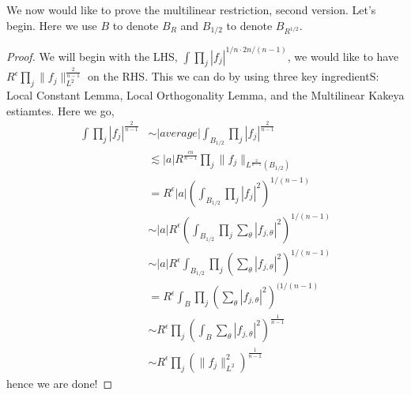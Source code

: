 We now would like to prove the multilinear restriction, second version. Let's begin. Here we use $B$ to denote $B_R$ and $B_{1/2}$ to denote $B_{R^{1/2}}$.
\begin{proof}
    We will begin with the LHS, $\int\prod_j|f_j|^{1/n\cdot2n/(n-1)}$, we would like to have $R^\epsilon\prod_j\|f_j\|_{L^2}^{\frac{2}{n-1}}$ on the RHS.
    This we can do by using three key ingredientS: Local Constant Lemma, Local Orthogonality Lemma, and the Multilinear Kakeya estiamtes. Here we go,
    \begin{align*}
        \int\prod_j|f_j|^{\frac{2}{n-1}}&\sim |average|\int_{B_{1/2}}\prod_j|f_j|^{\frac{2}{n-1}}\\
        &\lesssim |a|R^{\frac{\epsilon n}{n-1}}\prod_j\|f_j\|_{L^\frac{2}{n-1}(B_{1/2})}\\
        &=R^\epsilon |a|\left(\int_{B_{1/2}}\prod_j|f_j|^2\right)^{1/(n-1)}\\
        &\sim |a|R^\epsilon\left(\int_{B_{1/2}}\prod_j\sum_\theta|f_{j,\theta}|^2\right)^{1/(n-1)}\\
        &\sim |a|R^\epsilon\int_{B_{1/2}}\prod_j\left(\sum_\theta|f_{j,\theta}|^2\right)^{1/(n-1)}\\
        &=R^\epsilon\int_B\prod_j\left(\sum_\theta|f_{j,\theta}|^2\right)^{(1/(n-1)}\\
        &\sim R^\epsilon\prod_j\left(\int_B\sum_\theta|f_{j,\theta}|^2\right)^{\frac{1}{n-1}}\\
        &\sim R^\epsilon\prod_j\left(\|f_j\|_{L^2}^2 \right)^{\frac{1}{n-1}}
    \end{align*}
    hence we are done!
\end{proof}